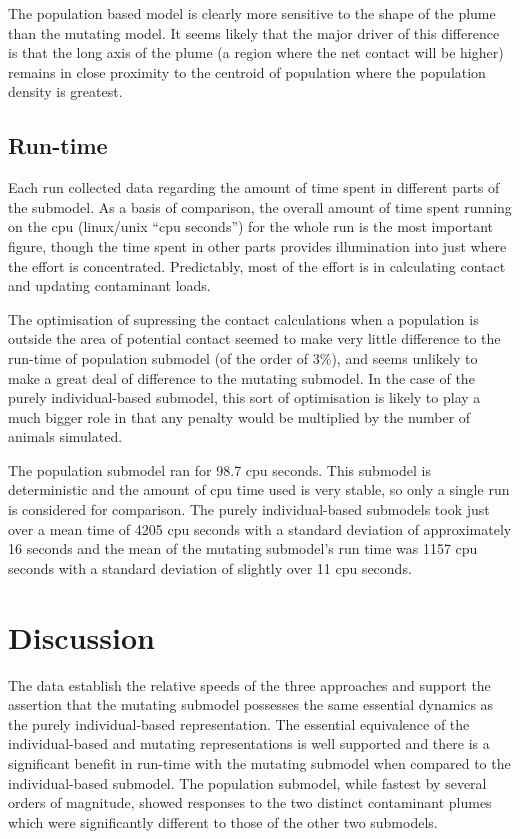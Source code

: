 \documentclass[preprint,authoryear,5p,twocolumn]{elsarticle}
\begin{document}
The population based model is clearly more sensitive to the shape of the plume than the mutating model. It seems likely
that the major driver of this difference is that the long axis of the plume (a region where the net contact will be
higher) remains in close proximity to the centroid of population where the population density is greatest.

\subsection{Run-time}

Each run collected data regarding the amount of time spent in different parts of the submodel. As a basis of
comparison, the overall amount of time spent running on the cpu (linux/unix ``cpu seconds'') for the whole run is the
most important figure, though the time spent in other parts provides illumination into just where the effort is
concentrated. Predictably, most of the effort is in calculating contact and updating contaminant loads.

The optimisation of supressing the contact calculations when a population is outside the area of potential contact
seemed to make very little difference to the run-time of population submodel (of the order of 3\%), and seems unlikely
to make a great deal of difference to the mutating submodel. In the case of the purely individual-based submodel, this
sort of optimisation is likely to play a much bigger role in that any penalty would be multiplied by the number of
animals simulated.

The population submodel ran for 98.7 cpu seconds. This submodel is deterministic and the amount of cpu time used is
very stable, so only a single run is considered for comparison. The purely individual-based submodels took just over a
mean time of 4205 cpu seconds with a standard deviation of approximately 16 seconds and the mean of the mutating
submodel's run time was 1157 cpu seconds with a standard deviation of slightly over 11 cpu seconds.



\section{Discussion}

The data establish the relative speeds of the three approaches and support the assertion that the mutating submodel
possesses the same essential dynamics as the purely individual-based representation. The essential equivalence of the
individual-based and mutating representations is well supported and there is a significant benefit in run-time with the
mutating submodel when compared to the individual-based submodel. The population submodel, while fastest by several
orders of magnitude, showed responses to the two distinct contaminant plumes which were significantly different to
those of the other two submodels.
\end{document}
